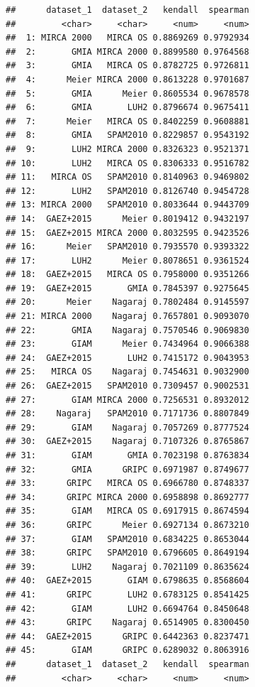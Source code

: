 \documentclass[
  11pt,
]{article}
\begin{document}
\begin{verbatim}
##      dataset_1  dataset_2   kendall  spearman
##         <char>     <char>     <num>     <num>
##  1: MIRCA 2000   MIRCA OS 0.8869269 0.9792934
##  2:       GMIA MIRCA 2000 0.8899580 0.9764568
##  3:       GMIA   MIRCA OS 0.8782725 0.9726811
##  4:      Meier MIRCA 2000 0.8613228 0.9701687
##  5:       GMIA      Meier 0.8605534 0.9678578
##  6:       GMIA       LUH2 0.8796674 0.9675411
##  7:      Meier   MIRCA OS 0.8402259 0.9608881
##  8:       GMIA   SPAM2010 0.8229857 0.9543192
##  9:       LUH2 MIRCA 2000 0.8326323 0.9521371
## 10:       LUH2   MIRCA OS 0.8306333 0.9516782
## 11:   MIRCA OS   SPAM2010 0.8140963 0.9469802
## 12:       LUH2   SPAM2010 0.8126740 0.9454728
## 13: MIRCA 2000   SPAM2010 0.8033644 0.9443709
## 14:  GAEZ+2015      Meier 0.8019412 0.9432197
## 15:  GAEZ+2015 MIRCA 2000 0.8032595 0.9423526
## 16:      Meier   SPAM2010 0.7935570 0.9393322
## 17:       LUH2      Meier 0.8078651 0.9361524
## 18:  GAEZ+2015   MIRCA OS 0.7958000 0.9351266
## 19:  GAEZ+2015       GMIA 0.7845397 0.9275645
## 20:      Meier    Nagaraj 0.7802484 0.9145597
## 21: MIRCA 2000    Nagaraj 0.7657801 0.9093070
## 22:       GMIA    Nagaraj 0.7570546 0.9069830
## 23:       GIAM      Meier 0.7434964 0.9066388
## 24:  GAEZ+2015       LUH2 0.7415172 0.9043953
## 25:   MIRCA OS    Nagaraj 0.7454631 0.9032900
## 26:  GAEZ+2015   SPAM2010 0.7309457 0.9002531
## 27:       GIAM MIRCA 2000 0.7256531 0.8932012
## 28:    Nagaraj   SPAM2010 0.7171736 0.8807849
## 29:       GIAM    Nagaraj 0.7057269 0.8777524
## 30:  GAEZ+2015    Nagaraj 0.7107326 0.8765867
## 31:       GIAM       GMIA 0.7023198 0.8763834
## 32:       GMIA      GRIPC 0.6971987 0.8749677
## 33:      GRIPC   MIRCA OS 0.6966780 0.8748337
## 34:      GRIPC MIRCA 2000 0.6958898 0.8692777
## 35:       GIAM   MIRCA OS 0.6917915 0.8674594
## 36:      GRIPC      Meier 0.6927134 0.8673210
## 37:       GIAM   SPAM2010 0.6834225 0.8653044
## 38:      GRIPC   SPAM2010 0.6796605 0.8649194
## 39:       LUH2    Nagaraj 0.7021109 0.8635624
## 40:  GAEZ+2015       GIAM 0.6798635 0.8568604
## 41:      GRIPC       LUH2 0.6783125 0.8541425
## 42:       GIAM       LUH2 0.6694764 0.8450648
## 43:      GRIPC    Nagaraj 0.6514905 0.8300450
## 44:  GAEZ+2015      GRIPC 0.6442363 0.8237471
## 45:       GIAM      GRIPC 0.6289032 0.8063916
##      dataset_1  dataset_2   kendall  spearman
##         <char>     <char>     <num>     <num>
\end{verbatim}
\end{document}
